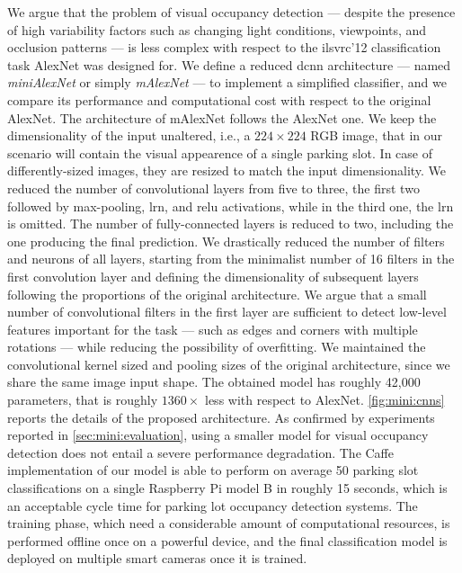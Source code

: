 We argue that the problem of visual occupancy detection --- despite the presence of high variability factors such as changing light conditions, viewpoints, and occlusion patterns --- is less complex with respect to the \gls{ilsvrc}'12 classification task AlexNet was designed for.
We define a reduced \gls{dcnn} architecture --- named \emph{miniAlexNet} or simply \emph{mAlexNet} --- to implement a simplified classifier, and we compare its performance and computational cost with respect to the original AlexNet.
The architecture of mAlexNet follows the AlexNet one.
We keep the dimensionality of the input unaltered, i.e., a $224 \times 224$ RGB image, that in our scenario will contain the visual appearence of a single parking slot.
In case of differently-sized images, they are resized to match the input dimensionality.
We reduced the number of convolutional layers from five to three, the first two followed by max-pooling, \gls{lrn}, and \gls{relu} activations, while in the third one, the \gls{lrn} is omitted.
The number of fully-connected layers is reduced to two, including the one producing the final prediction.
We drastically reduced the number of filters and neurons of all layers, starting from the minimalist number of 16 filters in the first convolution layer and defining the dimensionality of subsequent layers following the proportions of the original architecture.
We argue that a small number of convolutional filters in the first layer are sufficient to detect low-level features important for the task --- such as edges and corners with multiple rotations --- while reducing the possibility of overfitting.
We maintained the convolutional kernel sized and pooling sizes of the original architecture, since we share the same image input shape.
The obtained model has roughly 42,000 parameters, that is roughly $1360 \times$ less with respect to AlexNet.
\ref{fig:mini:cnns} reports the details of the proposed architecture.
As confirmed by experiments reported in \ref{sec:mini:evaluation}, using a smaller model for visual occupancy detection does not entail a severe performance degradation.
The Caffe implementation of our model is able to perform on average 50 parking slot classifications on a single Raspberry Pi model B in roughly 15 seconds, which is an acceptable cycle time for parking lot occupancy detection systems. %
The training phase, which need a considerable amount of computational resources, is performed offline once on a powerful device, and the final classification model is deployed on multiple smart cameras once it is trained.

